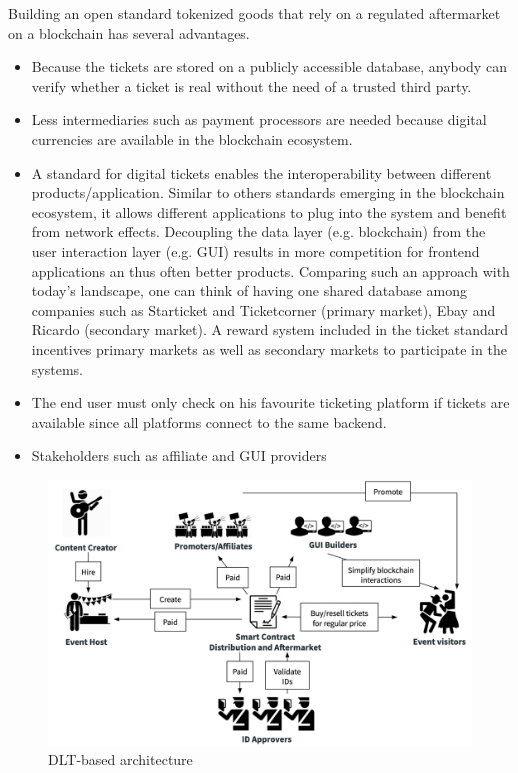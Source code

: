 Building an open standard tokenized goods that rely on a regulated aftermarket on a blockchain has several advantages.

\begin{itemize}
	\item Because the tickets are stored on a publicly accessible database, anybody can verify whether a ticket is real without the need of a trusted third party.
	\item Less intermediaries such as payment processors are needed because digital currencies are available in the blockchain ecosystem. 
	\item A standard for digital tickets enables the interoperability between different products/application. Similar to others standards emerging in the blockchain ecosystem, it allows different applications to plug into the system and benefit from network effects. Decoupling the data layer (e.g. blockchain) from the user interaction layer (e.g. GUI) results in more competition for frontend applications an thus often better products. Comparing such an approach with today's landscape, one can think of having one shared database among companies such as Starticket and Ticketcorner (primary market), Ebay and Ricardo (secondary market). A reward system included in the ticket standard incentives primary markets as well as secondary markets to participate in the systems. 
	\item The end user must only check on his favourite ticketing platform if tickets are available since all platforms connect to the same backend.
	\item Stakeholders such as affiliate and GUI providers 
\end{itemize}


\begin{figure}[H]
    \centering
    \includegraphics[width=16cm]{figures/dlt-based-landscape.png}
    \caption{DLT-based architecture}
    \label{fig:dlt-based-landscape}
\end{figure}

